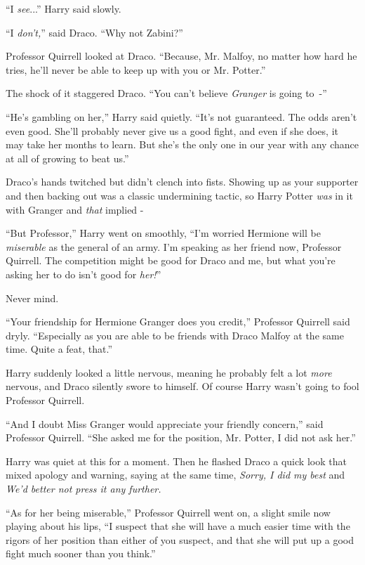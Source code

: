 ``I \emph{see}...'' Harry said slowly.

``I \emph{don't,}'' said Draco. ``Why not Zabini?''

Professor Quirrell looked at Draco. ``Because, Mr. Malfoy, no matter how hard he tries, he'll never be able to keep up with you or Mr. Potter.''

The shock of it staggered Draco. ``You can't believe \emph{Granger} is going to~-''

``He's gambling on her,'' Harry said quietly. ``It's not guaranteed. The odds aren't even good. She'll probably never give us a good fight, and even if she does, it may take her months to learn. But she's the only one in our year with any chance at all of growing to beat us.''

Draco's hands twitched but didn't clench into fists. Showing up as your supporter and then backing out was a classic undermining tactic, so Harry Potter \emph{was} in it with Granger and \emph{that} implied -

``But Professor,'' Harry went on smoothly, ``I'm worried Hermione will be \emph{miserable} as the general of an army. I'm speaking as her friend now, Professor Quirrell. The competition might be good for Draco and me, but what you're asking her to do isn't good for \emph{her!}''

Never mind.

``Your friendship for Hermione Granger does you credit,'' Professor Quirrell said dryly. ``Especially as you are able to be friends with Draco Malfoy at the same time. Quite a feat, that.''

Harry suddenly looked a little nervous, meaning he probably felt a lot \emph{more} nervous, and Draco silently swore to himself. Of course Harry wasn't going to fool Professor Quirrell.

``And I doubt Miss Granger would appreciate your friendly concern,'' said Professor Quirrell. ``She asked me for the position, Mr. Potter, I did not ask her.''

Harry was quiet at this for a moment. Then he flashed Draco a quick look that mixed apology and warning, saying at the same time, \emph{Sorry, I did my best} and \emph{We'd better not press it any further.}

``As for her being miserable,'' Professor Quirrell went on, a slight smile now playing about his lips, ``I suspect that she will have a much easier time with the rigors of her position than either of you suspect, and that she will put up a good fight much sooner than you think.''


